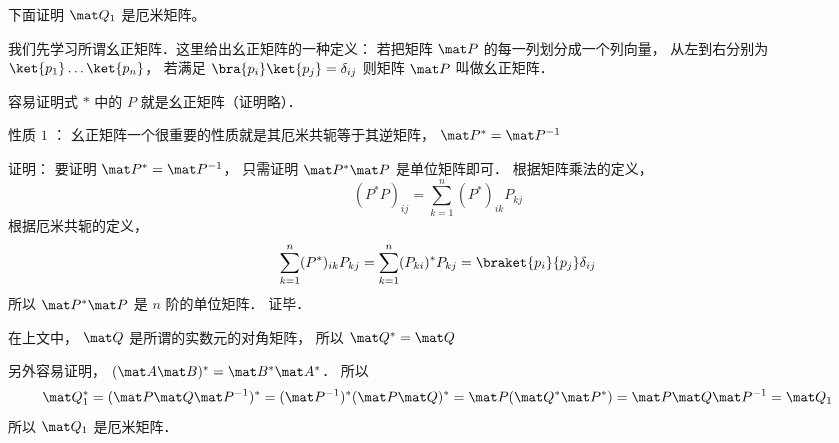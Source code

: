 下面证明 $\mat Q_1$ 是厄米矩阵。

我们先学习所谓幺正矩阵．这里给出幺正矩阵的一种定义： 若把矩阵 $\mat P$ 的每一列划分成一个列向量， 从左到右分别为$\ket{p_1} \dots\ket{p_n}$，  若满足 $\bra{p_i}\ket{p_j}=\delta_{ij}$ 则矩阵 $\mat P$ 叫做幺正矩阵．

容易证明式 $*$ 中的 $P$ 就是幺正矩阵（证明略）．

性质 $1$ ： 幺正矩阵一个很重要的性质就是其厄米共轭等于其逆矩阵， $\mat P^* = \mat P^{- 1}$

证明： 要证明 $\mat P^* = \mat P^{-1}$，  只需证明 $\mat P^* \mat P$ 是单位矩阵即可． 根据矩阵乘法的定义，
\begin{equation}
(P^* P)_{ij} = \sum_{k=1}^n (P^*)_{ik}P_{kj}
\end{equation}
根据厄米共轭的定义，
\begin{equation}
\sum_{k=1}^n (P^*)_{ik}P_{kj}  = \sum_{k=1}^n (P_{ki})^* P_{kj}  = \braket{p_i}{p_j} \delta_{ij}
\end{equation}
所以 $\mat P^* \mat P$ 是 $n$ 阶的单位矩阵．  证毕．

在上文中， $\mat Q$ 是所谓的实数元的对角矩阵， 所以 $\mat Q^* = \mat Q$

另外容易证明， $(\mat A\mat B)^* = \mat B^* \mat A^*$．  所以
\begin{equation}
\mat Q_1^* = (\mat P\mat Q\mat P^{-1})^* = (\mat P^{-1})^* (\mat P\mat Q)^* = \mat P(\mat Q^* \mat P^*) = \mat P\mat Q\mat P^{-1} = \mat Q_1
\end{equation}
所以 $\mat Q_1$ 是厄米矩阵．

